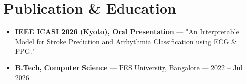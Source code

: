 \documentclass[10pt,a4paper]{article}
\begin{document}
\section*{Publication \& Education}
\begin{itemize}
\item \textbf{IEEE ICASI 2026 (Kyoto), Oral Presentation} --- "An Interpretable Model for Stroke Prediction and Arrhythmia Classification using ECG \& PPG."
\item \textbf{B.Tech, Computer Science} --- PES University, Bangalore --- 2022 -- Jul 2026
\end{itemize}
\end{document}
